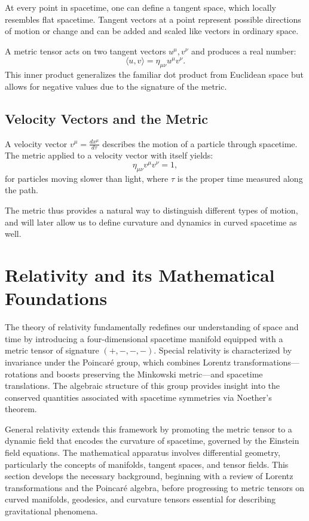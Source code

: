 \documentclass{amsart}
\theoremstyle{remark}
\begin{document}
At every point in spacetime, one can define a tangent space, which locally resembles flat spacetime. Tangent vectors at a point represent possible directions of motion or change and can be added and scaled like vectors in ordinary space.

A metric tensor acts on two tangent vectors \(u^\mu, v^\nu\) and produces a real number:
\[
\langle u, v \rangle = \eta_{\mu\nu} u^\mu v^\nu.
\]
This inner product generalizes the familiar dot product from Euclidean space but allows for negative values due to the signature of the metric.

\subsection{Velocity Vectors and the Metric}

A velocity vector \(v^\mu = \frac{dx^\mu}{d\tau}\) describes the motion of a particle through spacetime. The metric applied to a velocity vector with itself yields:
\[
\eta_{\mu\nu} v^\mu v^\nu = 1,
\]
for particles moving slower than light, where \(\tau\) is the proper time measured along the path.

The metric thus provides a natural way to distinguish different types of motion, and will later allow us to define curvature and dynamics in curved spacetime as well.

\section{Relativity and its Mathematical Foundations}
\label{sec:relativity}

The theory of relativity fundamentally redefines our understanding of space and time by introducing a four-dimensional spacetime manifold equipped with a metric tensor of signature \((+,-,-,-)\). Special relativity is characterized by invariance under the Poincaré group, which combines Lorentz transformations—rotations and boosts preserving the Minkowski metric—and spacetime translations. The algebraic structure of this group provides insight into the conserved quantities associated with spacetime symmetries via Noether’s theorem.

General relativity extends this framework by promoting the metric tensor to a dynamic field that encodes the curvature of spacetime, governed by the Einstein field equations. The mathematical apparatus involves differential geometry, particularly the concepts of manifolds, tangent spaces, and tensor fields. This section develops the necessary background, beginning with a review of Lorentz transformations and the Poincaré algebra, before progressing to metric tensors on curved manifolds, geodesics, and curvature tensors essential for describing gravitational phenomena.
\end{document}
